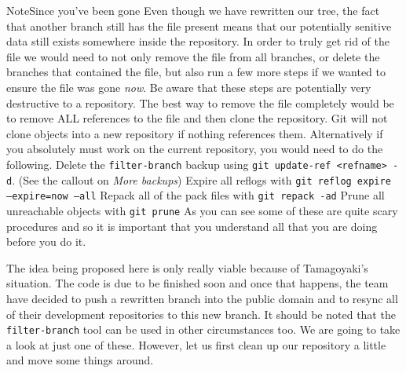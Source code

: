 \begin{callout}{Note}{Since you've been gone}
Even though we have rewritten our tree, the fact that another branch still has the file present means that our potentially senitive data still exists somewhere inside the repository.
In order to truly get rid of the file we would need to not only remove the file from all branches, or delete the branches that contained the file,
but also run a few more steps if we wanted to ensure the file was gone \emph{now}.
Be aware that these steps are potentially very destructive to a repository.
The best way to remove the file completely would be to remove ALL references to the file and then clone the repository.
Git will not clone objects into a new repository if nothing references them.
Alternatively if you absolutely must work on the current repository, you would need to do the following.
\newline
\newline
Delete the \texttt{filter-branch} backup using \texttt{git update-ref <refname> -d}.  (See the callout on \emph{More backups})
\newline
\newline
Expire all reflogs with \texttt{git reflog expire --expire=now --all}
\newline
\newline
Repack all of the pack files with \texttt{git repack -ad}
\newline
\newline
Prune all unreachable objects with \texttt{git prune}
\newline
\newline
As you can see some of these are quite scary procedures and so it is important that you understand all that you are doing before you do it.
\end{callout}

The idea being proposed here is only really viable because of Tamagoyaki's situation.
The code is due to be finished soon and once that happens, the team have decided to push a rewritten branch into the public domain and to resync all of their development repositories to this new branch.
It should be noted that the \texttt{filter-branch} tool can be used in other circumstances too.
We are going to take a look at just one of these.
However, let us first clean up our repository a little and move some things around.

